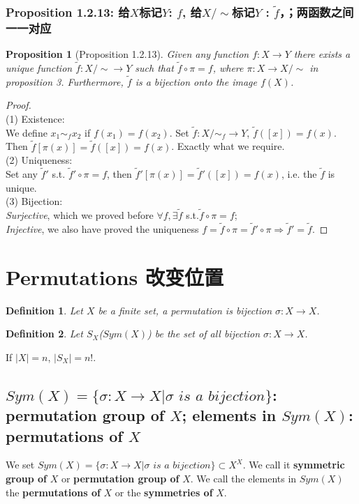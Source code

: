 \documentclass[11pt,a4paper]{article}
\newtheorem{proposition}{Proposition}
\newtheorem{definition}{Definition}
\begin{document}
\subsubsection{Proposition 1.2.13: 给$X$标记$Y$: $f$, 给$X/\sim$标记$Y$ : $\tilde{f}$，；两函数之间一一对应}
\begin{proposition}[Proposition 1.2.13]
    Given any function $f:X \rightarrow Y$ there exists a unique function $\tilde{f}:X/\sim \rightarrow Y$ such that $\tilde{f}\circ \pi=f$, where $\pi: X \rightarrow X/\sim$ in proposition 3. Furthermore, $\tilde{f}$ is a bijection onto the image $f(X)$.
\end{proposition}
\begin{proof}
\quad\\
(1) Existence:\\
We define $x_1\sim_f x_2$ if $f(x_1)=f(x_2)$. Set $\tilde{f}:X/\sim_f \rightarrow Y$, $\tilde{f}([x])=f(x)$. Then $\tilde{f}[\pi(x)]=\tilde{f}([x])=f(x)$. Exactly what we require.\\
(2) Uniqueness:\\
Set any $\tilde{f}'$ s.t. $\tilde{f}'\circ\pi=f$, then $\tilde{f}'[\pi(x)]=\tilde{f}'([x])=f(x)$, i.e. the $\tilde{f}$ is unique.\\
(3) Bijection:\\
\textit{Surjective}, which we proved before $\forall f, \exists \tilde{f}$ s.t.$\tilde{f}\circ\pi=f$;\\
\textit{Injective}, we also have proved the uniqueness $f=\tilde{f}\circ\pi=\tilde{f}'\circ\pi\Rightarrow\tilde{f}'=\tilde{f}$.
\end{proof}

\section{Permutations 改变位置}
\begin{definition}
    Let $X$ be a finite set, a permutation is bijection $\sigma:X \rightarrow X$.
\end{definition}
\begin{definition}
    Let $S_X$($Sym(X)$) be the set of all bijection $\sigma:X \rightarrow X$.
\end{definition}
If $|X|=n$, $|S_X|=n!$.

\subsection{$Sym(X)=\{\sigma: X\rightarrow X| \sigma \textit{ is a bijection} \}$: \textbf{permutation group of} $X$; elements in $Sym(X)$: \textbf{permutations of} $X$}
We set $Sym(X)=\{\sigma: X\rightarrow X| \sigma \textit{ is a bijection} \}\subset X^X$. We call it \textbf{symmetric group of} $X$ or \textbf{permutation group of} $X$. We call the elements in $Sym(X)$ the \textbf{permutations of} $X$ or the \textbf{symmetries of} $X$.
\end{document}
